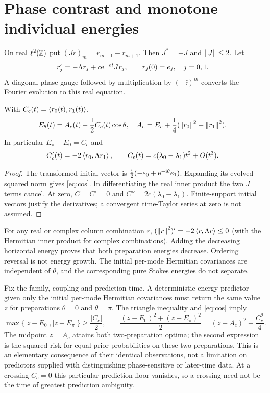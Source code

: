 \documentclass[11pt]{article}
\begin{document}
\section{Phase contrast and monotone individual energies}
On real $\ell^2(\mathbb Z)$ put $(Jr)_m=r_{m-1}-r_{m+1}$.
Then $J^*=-J$ and $\left\lVert J\right\rVert\leq2$. Let
\begin{equation}\label{eq:chain}
 r_j'=-\Lambda r_j+c\mathrm e^{-\rho t}Jr_j,\qquad r_j(0)=e_j,\quad j=0,1.
\end{equation}
A diagonal phase gauge followed by multiplication by $(-\ii)^m$ converts
the Fourier evolution to this real equation.
\begin{proposition}
With $C_c(t)=\left\langle r_0(t),r_1(t)\right\rangle$,
\begin{equation}\label{eq:cos}
 E_\theta(t)=A_c(t)-\frac12 C_c(t)\cos\theta,\quad
 A_c=E_v+\frac14(\left\lVert r_0\right\rVert^2+\left\lVert r_1\right\rVert^2).
\end{equation}
In particular $E_\pi-E_0=C_c$ and
\[
 C_c'(t)=-2\left\langle r_0,\Lambda r_1\right\rangle,\qquad
 C_c(t)=c(\lambda_0-\lambda_1)t^2+O(t^3).
\]
\end{proposition}
\begin{proof}
The transformed initial vector is
$\frac{\mathrm i}{2}(-e_0+\mathrm e^{-\mathrm i\theta}e_1)$. Expanding its evolved squared
norm gives \eqref{eq:cos}. In differentiating the real inner product the
two $J$ terms cancel. At zero, $C=C'=0$ and
$C''=2c(\lambda_0-\lambda_1)$. Finite-support initial vectors justify
the derivatives; a convergent time-Taylor series at zero is not assumed.
\end{proof}
For any real or complex column combination $r$,
$(\left\lVert r\right\rVert^2)'=-2\left\langle r,\Lambda r\right\rangle\leq0$ (with the Hermitian inner product
for complex combinations). Adding the decreasing horizontal energy proves
that both preparation energies decrease. Ordering reversal is not energy
growth. The initial per-mode Hermitian covariances are independent of
$\theta$, and the corresponding pure Stokes energies do not separate.

\begin{remark}\label{rem:prediction}
Fix the family, coupling and prediction time. A deterministic energy
predictor given only the initial per-mode Hermitian covariances must return
the same value $z$ for preparations $\theta=0$ and $\theta=\pi$.
The triangle inequality and \eqref{eq:cos} imply
\[
 \max\{|z-E_0|,|z-E_\pi|\}\geq\frac{|C_c|}{2},\qquad
 \frac{(z-E_0)^2+(z-E_\pi)^2}{2}
   =(z-A_c)^2+\frac{C_c^2}{4}.
\]
The midpoint $z=A_c$ attains both two-preparation optima; the second
expression is the squared risk for equal prior probabilities on these
two preparations. This is an elementary consequence of their identical
observations, not a limitation on predictors supplied with distinguishing
phase-sensitive or later-time data. At a crossing $C_c=0$ this particular
prediction floor vanishes, so a crossing need not be the time of greatest
prediction ambiguity.
\end{remark}
\end{document}

